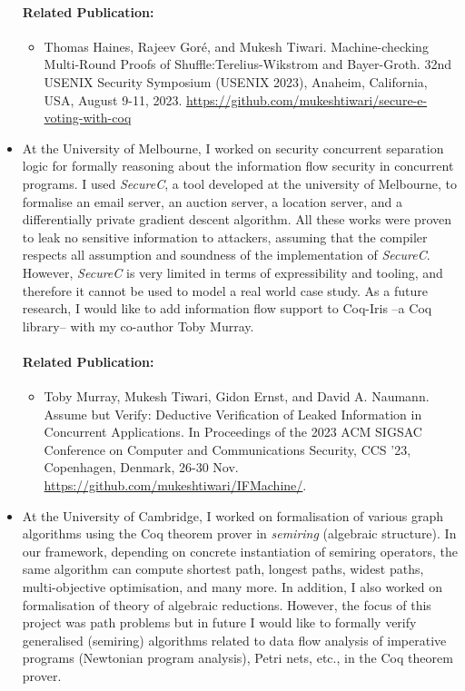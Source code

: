 \documentclass[a4paper]{article}
\begin{document}
\begin{itemize}
\paragraph{Related Publication:} 
\begin{itemize}
    \item Thomas Haines, Rajeev Gor{\'e}, and Mukesh Tiwari.
    Machine-checking Multi-Round Proofs of Shuffle:Terelius-Wikstrom and Bayer-Groth. 
    32nd USENIX Security Symposium (USENIX 2023), Anaheim, California, USA, August 9-11, 2023.
    {\url{https://github.com/mukeshtiwari/secure-e-voting-with-coq}}

\end{itemize}


\item At the University of Melbourne, I worked on 
security concurrent separation logic for formally reasoning about the information 
flow security in concurrent programs. I used \textit{SecureC}, a tool developed at the university of 
Melbourne, to formalise an email server, an auction server, a location server, and 
a differentially private gradient descent algorithm. 
All these works were proven to leak no sensitive 
information to attackers, assuming that the compiler respects all 
assumption and soundness of the implementation of \textit{SecureC}. However, 
\textit{SecureC} is very limited in terms of expressibility and tooling, 
and therefore it cannot be used to model a real world case study. As a future research, 
I would like to add information flow support to Coq-Iris --a Coq library-- 
with my co-author Toby Murray.


\paragraph{Related Publication:} 
\begin{itemize}
\item { Toby Murray, Mukesh Tiwari, Gidon Ernst, and David A. Naumann. 
Assume but Verify: Deductive Verification of Leaked Information in Concurrent Applications. 
In Proceedings of the 2023 ACM SIGSAC Conference on 
Computer and Communications Security, CCS '23, Copenhagen, Denmark, 26-30 Nov.}
{\url{https://github.com/mukeshtiwari/IFMachine/}}.
\end{itemize}


\item At the University of Cambridge, I worked on formalisation of 
various graph algorithms using the Coq theorem prover in \emph{semiring} 
(algebraic structure). In our framework, depending on concrete 
instantiation of semiring operators,
the same algorithm can compute shortest path, longest paths, widest paths, 
multi-objective optimisation, and many more. In addition, 
I also worked on formalisation of theory of algebraic reductions. 
However, the focus of this project was path problems but in future I would 
like to formally verify generalised (semiring) algorithms related to 
data flow analysis of imperative programs (Newtonian program analysis), Petri nets, etc., 
in the Coq theorem prover.



\end{itemize}
\end{document}
